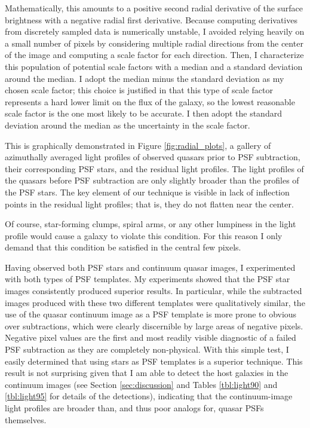 
 Mathematically, this amounts to a positive second radial derivative of the surface brightness with a negative radial first derivative. Because computing derivatives from discretely sampled data is numerically unstable, I avoided relying heavily on a small number of pixels by considering multiple radial directions from the center of the image and computing a scale factor for each direction.  Then, I characterize this population of potential scale factors with a median and a standard deviation around the median.  I adopt the median minus the standard deviation as my chosen scale factor; this choice is justified in that this type of scale factor represents a hard lower limit on the flux of the galaxy, so the lowest reasonable scale factor is the one most likely to be accurate.  I then adopt the standard deviation around the median as the uncertainty in the scale factor.

This is graphically demonstrated in Figure \ref{fig:radial_plots}, a gallery of azimuthally averaged light profiles of observed quasars prior to PSF subtraction, their corresponding PSF stars, and the residual light profiles.  The light profiles of the quasars before PSF subtraction are only slightly broader than the profiles of the PSF stars.  The key element of our technique is visible in lack of inflection points in the residual light profiles; that is, they do not flatten near the center.

Of course, star-forming clumps, spiral arms, or any other lumpiness in the light profile would cause a galaxy to violate this condition. For this reason I only demand that this condition be satisfied in the central few pixels.

Having observed both PSF stars and continuum quasar images, I experimented with both types of PSF templates. My experiments showed that the PSF star images consistently produced superior results. In particular, while the subtracted images produced with these two different templates were qualitatively similar, the use of the quasar continuum image as a PSF template is more prone to obvious over subtractions, which were clearly discernible by large areas of negative pixels. Negative pixel values are the first and most readily visible diagnostic of a failed PSF subtraction as they are completely non-physical. With this simple test, I easily determined that using stars as PSF templates is a superior technique. This result is not surprising given that I am able to detect the host galaxies in the continuum images (see Section \ref{sec:discussion} and Tables \ref{tbl:light90} and \ref{tbl:light95} for details of the detections), indicating that the continuum-image light profiles are broader than, and thus poor analogs for, quasar PSFs themselves.

